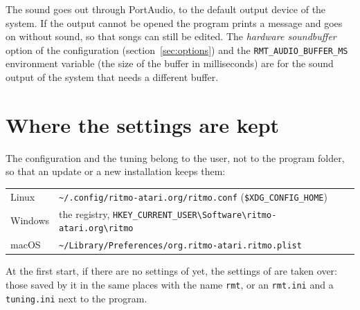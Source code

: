 The sound goes out through PortAudio, to the default output device of the system. If the output cannot be opened
the program prints a message and goes on without sound, so that songs can still be edited. The
\emph{hardware soundbuffer} option of the configuration (section~\ref{sec:options}) and the
\texttt{RMT\_AUDIO\_BUFFER\_MS} environment variable (the size of the buffer in milliseconds) are for the sound
output of the system that needs a different buffer.

\section{Where the settings are kept}

The configuration and the tuning belong to the user, not to the program folder, so that an update
or a new installation keeps them:

\begin{center}
\begin{tabular}{@{}ll@{}}
\toprule
Linux & \texttt{\textasciitilde/.config/ritmo-atari.org/ritmo.conf} (\texttt{\$XDG\_CONFIG\_HOME}) \\
Windows & the registry, \texttt{HKEY\_CURRENT\_USER\textbackslash Software\textbackslash ritmo-atari.org\textbackslash ritmo} \\
macOS & \texttt{\textasciitilde/Library/Preferences/org.ritmo-atari.ritmo.plist} \\
\bottomrule
\end{tabular}
\end{center}

At the first start, if there are no settings of \RITMO{} yet, the settings of \RMT{} are taken over: those
saved by it in the same places with the name \texttt{rmt}, or an \texttt{rmt.ini} and a
\texttt{tuning.ini} next to the program.
